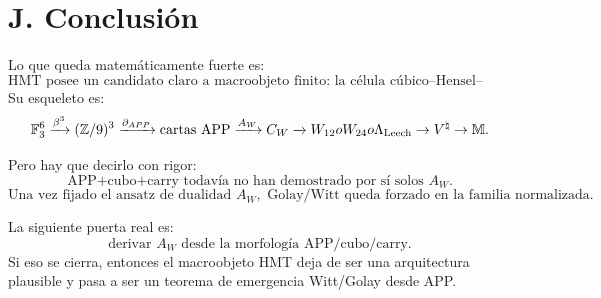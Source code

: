 \documentclass[11pt,a4paper]{article}
\theoremstyle{definition}\newtheorem{definicion}[teorema]{Definici\'on}
\theoremstyle{remark}\newtheorem{observacion}[teorema]{Observaci\'on}
\newcommand{\F}{\mathbb F}
\newcommand{\Z}{\mathbb Z}
\newcommand{\Leech}{\Lambda_{\rm Leech}}
\newcommand{\Vnat}{V^\natural}
\newcommand{\Monster}{\mathbb M}
\begin{document}
\section{J. Conclusi\'on}

Lo que queda matem\'aticamente fuerte es:
\[
\boxed{\text{HMT posee un candidato claro a macroobjeto finito: la c\'elula c\'ubico--Hensel--Witt.}}
\]
Su esqueleto es:
\[
\F_3^6
\xrightarrow{\beta^3}
(\Z/9)^3
\xrightarrow{\partial_{APP}}
\text{cartas APP}
\xrightarrow{A_W}
C_W
\xrightarrow{}
W_{12}	o W_{24}	o\Leech\to\Vnat\to\Monster.
\]

Pero hay que decirlo con rigor:
\[
\boxed{\text{APP+cubo+carry todav\'ia no han demostrado por s\'i solos }A_W.}
\]
\[
\boxed{\text{Una vez fijado el ansatz de dualidad }A_W,\text{ Golay/Witt queda forzado en la familia normalizada.}}
\]

La siguiente puerta real es:
\[
\boxed{\text{derivar }A_W\text{ desde la morfolog\'ia APP/cubo/carry.}}
\]
Si eso se cierra, entonces el macroobjeto HMT deja de ser una arquitectura plausible y pasa a ser un teorema de emergencia Witt/Golay desde APP.
\end{document}

